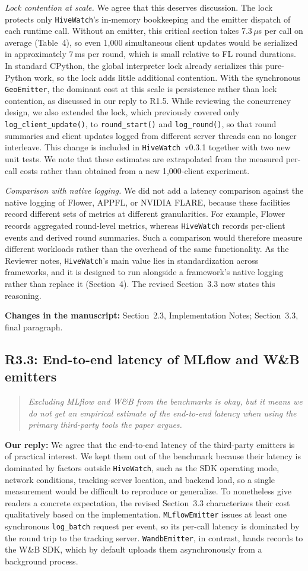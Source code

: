 \documentclass[11pt]{article}
\newenvironment{reviewer}{\begin{quote}\itshape\color{blue}}{\end{quote}}
\newcommand{\comment}[2]{\subsection*{R#1: #2}}
\newcommand{\response}{\noindent\textbf{Our reply:} }
\newcommand{\location}[1]{\noindent\textbf{Changes in the manuscript:} #1}
\newcommand{\HW}{\texttt{HiveWatch}}
\begin{document}
\emph{Lock contention at scale.} We agree that this deserves discussion. The lock protects only \HW{}'s in-memory bookkeeping and the emitter dispatch of each runtime call. Without an emitter, this critical section takes 7.3\,$\mu$s per call on average (Table~4), so even 1{,}000 simultaneous client updates would be serialized in approximately 7\,ms per round, which is small relative to FL round durations. In standard CPython, the global interpreter lock already serializes this pure-Python work, so the lock adds little additional contention. With the synchronous \texttt{GeoEmitter}, the dominant cost at this scale is persistence rather than lock contention, as discussed in our reply to R1.5. While reviewing the concurrency design, we also extended the lock, which previously covered only \texttt{log\_client\_update()}, to \texttt{round\_start()} and \texttt{log\_round()}, so that round summaries and client updates logged from different server threads can no longer interleave. This change is included in \HW{}~v0.3.1 together with two new unit tests. We note that these estimates are extrapolated from the measured per-call costs rather than obtained from a new 1{,}000-client experiment.

\emph{Comparison with native logging.} We did not add a latency comparison against the native logging of Flower, APPFL, or NVIDIA FLARE, because these facilities record different sets of metrics at different granularities. For example, Flower records aggregated round-level metrics, whereas \HW{} records per-client events and derived round summaries. Such a comparison would therefore measure different workloads rather than the overhead of the same functionality. As the Reviewer notes, \HW{}'s main value lies in standardization across frameworks, and it is designed to run alongside a framework's native logging rather than replace it (Section~4). The revised Section~3.3 now states this reasoning.

\location{Section~2.3, Implementation Notes; Section~3.3, final paragraph.}

\comment{3.3}{End-to-end latency of MLflow and W\&B emitters}
\begin{reviewer}
Excluding MLflow and W\&B from the benchmarks is okay, but it means we do not get an empirical estimate of the end-to-end latency when using the primary third-party tools the paper argues.
\end{reviewer}
\response We agree that the end-to-end latency of the third-party emitters is of practical interest. We kept them out of the benchmark because their latency is dominated by factors outside \HW{}, such as the SDK operating mode, network conditions, tracking-server location, and backend load, so a single measurement would be difficult to reproduce or generalize. To nonetheless give readers a concrete expectation, the revised Section~3.3 characterizes their cost qualitatively based on the implementation. \texttt{MLflowEmitter} issues at least one synchronous \texttt{log\_batch} request per event, so its per-call latency is dominated by the round trip to the tracking server. \texttt{WandbEmitter}, in contrast, hands records to the W\&B SDK, which by default uploads them asynchronously from a background process.
\end{document}
